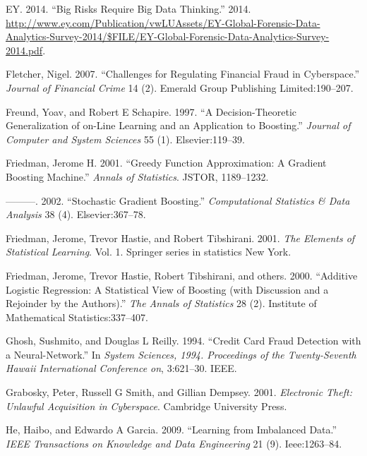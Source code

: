\documentclass[12pt,]{article}
\begin{document}
\leavevmode\hypertarget{ref-analytics_tools_table}{}%
EY. 2014. ``Big Risks Require Big Data Thinking.'' 2014.
\url{http://www.ey.com/Publication/vwLUAssets/EY-Global-Forensic-Data-Analytics-Survey-2014/$FILE/EY-Global-Forensic-Data-Analytics-Survey-2014.pdf}.

\leavevmode\hypertarget{ref-fletcher2007challenges}{}%
Fletcher, Nigel. 2007. ``Challenges for Regulating Financial Fraud in
Cyberspace.'' \emph{Journal of Financial Crime} 14 (2). Emerald Group
Publishing Limited:190--207.

\leavevmode\hypertarget{ref-freund1997decision}{}%
Freund, Yoav, and Robert E Schapire. 1997. ``A Decision-Theoretic
Generalization of on-Line Learning and an Application to Boosting.''
\emph{Journal of Computer and System Sciences} 55 (1). Elsevier:119--39.

\leavevmode\hypertarget{ref-friedman2001greedy}{}%
Friedman, Jerome H. 2001. ``Greedy Function Approximation: A Gradient
Boosting Machine.'' \emph{Annals of Statistics}. JSTOR, 1189--1232.

\leavevmode\hypertarget{ref-friedman2002stochastic}{}%
---------. 2002. ``Stochastic Gradient Boosting.'' \emph{Computational
Statistics \& Data Analysis} 38 (4). Elsevier:367--78.

\leavevmode\hypertarget{ref-friedman2001elements}{}%
Friedman, Jerome, Trevor Hastie, and Robert Tibshirani. 2001. \emph{The
Elements of Statistical Learning}. Vol. 1. Springer series in statistics
New York.

\leavevmode\hypertarget{ref-friedman2000additive}{}%
Friedman, Jerome, Trevor Hastie, Robert Tibshirani, and others. 2000.
``Additive Logistic Regression: A Statistical View of Boosting (with
Discussion and a Rejoinder by the Authors).'' \emph{The Annals of
Statistics} 28 (2). Institute of Mathematical Statistics:337--407.

\leavevmode\hypertarget{ref-ghosh1994credit}{}%
Ghosh, Sushmito, and Douglas L Reilly. 1994. ``Credit Card Fraud
Detection with a Neural-Network.'' In \emph{System Sciences, 1994.
Proceedings of the Twenty-Seventh Hawaii International Conference on},
3:621--30. IEEE.

\leavevmode\hypertarget{ref-grabosky2001electronic}{}%
Grabosky, Peter, Russell G Smith, and Gillian Dempsey. 2001.
\emph{Electronic Theft: Unlawful Acquisition in Cyberspace}. Cambridge
University Press.

\leavevmode\hypertarget{ref-he2009learning}{}%
He, Haibo, and Edwardo A Garcia. 2009. ``Learning from Imbalanced
Data.'' \emph{IEEE Transactions on Knowledge and Data Engineering} 21
(9). Ieee:1263--84.
\end{document}
